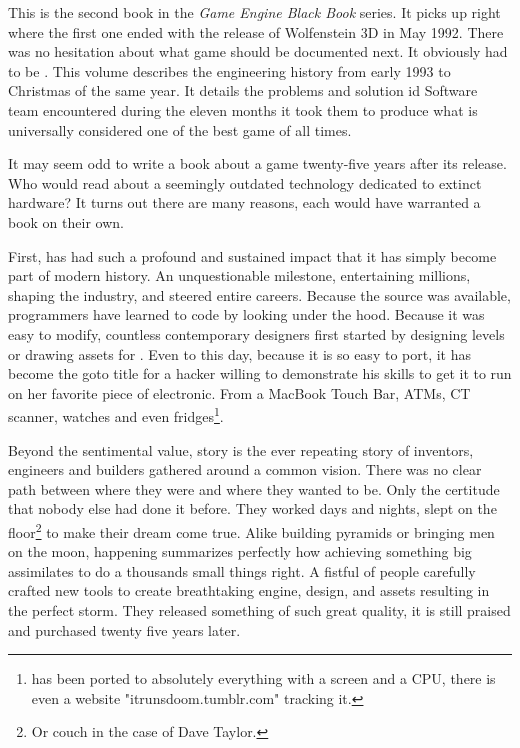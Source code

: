 This is the second book in the \textit{Game Engine Black Book} series. It picks up right where the first one ended with the release of Wolfenstein 3D in May 1992. There was no hesitation about what game should be documented next. It obviously had to be \doom. This volume describes the engineering history from early 1993 to Christmas of the same year. It details the problems and solution id Software team encountered during the eleven months it took them to produce what is universally considered one of the best game of all times.\\
\par
It may seem odd to write a book about a game twenty-five years after its release. Who would read about a seemingly outdated technology dedicated to extinct hardware? It turns out there are many reasons, each would have warranted a book on their own.\\ 
\par
First, \doom has had such a profound and sustained impact that it has simply become part of modern history. An unquestionable milestone, entertaining millions, shaping the industry, and steered entire careers. Because the source was available, programmers have learned to code by looking under the hood. Because it was easy to modify, countless contemporary designers first started by designing levels or drawing assets for \doom. Even to this day, because it is so easy to port, it has become the goto title for a hacker willing to demonstrate his skills to get it to run on her favorite piece of electronic. From a MacBook Touch Bar, ATMs, CT scanner, watches and even fridges\footnote{\doom has been ported to absolutely everything with a screen and a CPU, there is even a website "itrunsdoom.tumblr.com" tracking it.}.\\
\par
Beyond the sentimental value, \doom story is the ever repeating story of inventors, engineers and builders gathered around a common vision. There was no clear path between where they were and where they wanted to be. Only the certitude that nobody else had done it before. They worked days and nights, slept on the floor\footnote{Or couch in the case of Dave Taylor.} to make their dream come true. Alike building pyramids or bringing men on the moon, \doom happening summarizes perfectly how achieving something big assimilates to do a thousands small things right. A fistful of people carefully crafted new tools to create breathtaking engine, design, and assets resulting in the perfect storm. They released something of such great quality, it is still praised and purchased twenty five years later.\\
